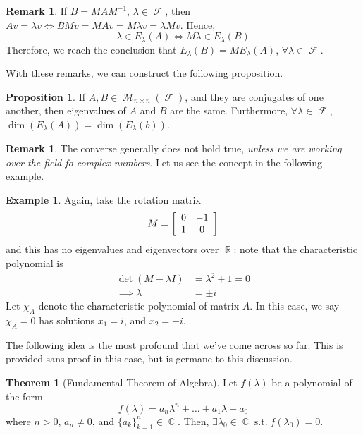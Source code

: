 \documentclass[11pt]{amsart} %
\theoremstyle{definition}
\newtheorem{proposition}[definition]{Proposition}
\newtheorem{theorem}[definition]{Theorem}
\newtheorem{example}[definition]{Example}
\theoremstyle{definition}
\newtheorem{remark}[definition]{Remark}
\DeclareMathOperator{\R}{\mathbb{R}}
\DeclareMathOperator{\FF}{\mathcal{F}}
\DeclareMathOperator{\Com}{\mathbb{C}}
\DeclareMathOperator{\suchthat}{\text{ s.t. }}
\DeclareMathOperator{\Ma}{\mathcal{M}}
\numberwithin{equation}{section}
\begin{document}
\begin{remark}
	If $B=MAM^{-1}$, $\lambda \in \FF$, then $Av = \lambda v \iff BMv = MA v = M \lambda v = \lambda Mv$. Hence,
	$$ \lambda \in E_{\lambda} (A) \iff M \lambda \in E_{\lambda} (B) $$
	Therefore, we reach the conclusion that $E_{\lambda } (B) = M E_{\lambda} (A)$, $\forall \lambda \in \FF$.
\end{remark}

With these remarks, we can construct the following proposition.

\begin{proposition}
	If $A,B \in \Ma_{n \times n} (\FF)$, and they are conjugates of one another, then eigenvalues of $A$ and $B$ are the same. Furthermore, $\forall \lambda \in \FF$, $\dim (E_{\lambda} (A) ) = \dim (E_{\lambda} (b) ) $.
\end{proposition}

\begin{remark}
	\label{conversefalse1}
	The converse generally does not hold true, \textit{unless we are working over the field fo complex numbers}. Let us see the concept in the following example.
\end{remark}

\begin{example}
	Again, take the rotation matrix
	$$M = \left[\begin{array}{ c c}  0 & -1 \\ 1 & 0 \end{array}\right] $$
	and this has no eigenvalues and eigenvectors over $\R$: note that the characteristic polynomial is
	\begin{align*}
	\det (M - \lambda I) &= \lambda^2 + 1 = 0 \\
	\implies \lambda &= \pm i
	\end{align*}
	Let $\chi_{A}$ denote the characteristic polynomial of matrix $A$. In this case, we say $\chi_{A}=0$ has solutions $x_1 = i$, and $x_2 = -i$.
\end{example}

The following idea is the most profound that we've come across so far. This is provided sans proof in this case, but is germane to this discussion.

\begin{theorem}[Fundamental Theorem of Algebra]
	\label{fundamentalthmofalgebra}
	Let $f(\lambda) $ be a polynomial of the form
	$$ f(\lambda) = a_n \lambda^n + \dots + a_1 \lambda + a_0 $$
	where $n>0$, $a_n \neq 0$, and $\{a_k \}_{k=1}^{n} \in \Com$. Then, $\exists \lambda_0 \in \Com \suchthat f(\lambda_0) =0$.
\end{theorem}
\end{document}
